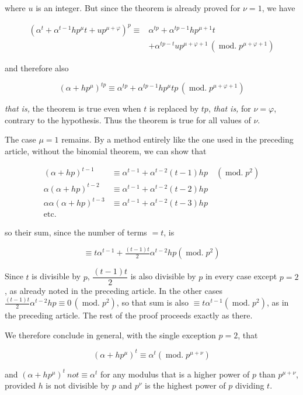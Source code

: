\noindent where $u$ is an integer. But since the theorem is already proved for $\nu=1$, we have

\[\begin{aligned}
(\alpha^t+\alpha^{t-1}hp^{\mu}t+up^{\mu+\varphi})^p\equiv{}&\alpha^{tp}+\alpha^{tp-1}hp^{\mu+1}t\\
&+\alpha^{tp-t}up^{\mu+\varphi+1}\,(\operatorname{mod.}p^{\mu+\varphi+1})
\end{aligned}\]

\noindent and therefore also

\[(\alpha+hp^{\mu})^{tp}\equiv\alpha^{tp}+\alpha^{tp-1}hp^{\mu}tp\,(\operatorname{mod.}p^{\mu+\varphi+1})\]

\noindent \emph{that is,} the theorem is true even when $t$ is replaced by $tp$, \emph{that is,} for $\nu=\varphi$, contrary to the hypothesis. Thus the theorem is true for all values of $\nu$.

The case $\mu=1$ remains. By a method entirely like the one used in the preceding article, without the binomial theorem, we can show that

\[\begin{aligned}
(\alpha+hp)^{t-1}&\equiv\alpha^{t-1}+\alpha^{t-2}(t-1)hp\quad(\operatorname{mod.}p^2)\\
\alpha(\alpha+hp)^{t-2}&\equiv\alpha^{t-1}+\alpha^{t-2}(t-2)hp\\
\alpha\alpha(\alpha+hp)^{t-3}&\equiv\alpha^{t-1}+\alpha^{t-2}(t-3)hp\\
\text{etc.}\quad&
\end{aligned}\]

\noindent so their sum, since the number of terms $=t$, is

\[\equiv t\alpha^{t-1}+\tfrac{(t-1)t}{2}\alpha^{t-2}hp(\operatorname{mod.}p^2)\]

Since $t$ is divisible by $p$, $\dfrac{(t-1)t}{2}$ is also divisible by $p$ in every case except $p=2$, as already noted in the preceding article. In the other cases $\tfrac{(t-1)t}{2}\alpha^{t-2}hp\equiv0\,(\operatorname{mod.}p^2)$, so that sum is also $\equiv t\alpha^{t-1}(\operatorname{mod.}p^2)$, as in the preceding article. The rest of the proof proceeds exactly as there.

We therefore conclude in general, with the single exception $p=2$, that

\[(\alpha+hp^{\mu})^t\equiv\alpha^t(\operatorname{mod.}p^{\mu+\nu})\]

\noindent and $(\alpha+hp^{\mu})^t\ \textit{not}\equiv\alpha^t$ for any modulus that is a higher power of $p$ than $p^{\mu+\nu}$, provided $h$ is not divisible by $p$ and $p^{\nu}$ is the highest power of $p$ dividing $t$.

